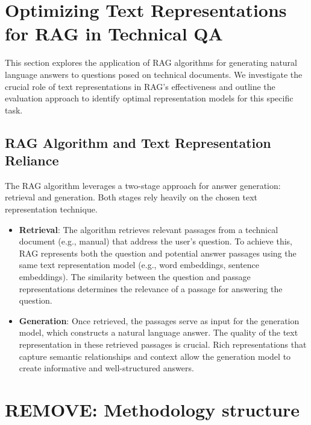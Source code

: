 %

\section{Optimizing Text Representations for \ac{RAG} in Technical \ac{QA}}
This section explores the application of \ac{RAG} algorithms for generating natural language answers to questions posed on technical documents.
We investigate the crucial role of text representations in \ac{RAG}'s effectiveness and outline the evaluation approach to identify optimal representation models for this specific task.

\subsection{\ac{RAG} Algorithm and Text Representation Reliance}
The RAG algorithm leverages a two-stage approach for answer generation: retrieval and generation.
Both stages rely heavily on the chosen text representation technique.

\begin{itemize}
  \item \textbf{Retrieval}: The algorithm retrieves relevant passages from a technical document (e.g., manual) that address the user's question. To achieve this, RAG represents both the question and potential answer passages using the same text representation model (e.g., word embeddings, sentence embeddings). The similarity between the question and passage representations determines the relevance of a passage for answering the question.  
  \item \textbf{Generation}: Once retrieved, the passages serve as input for the generation model, which constructs a natural language answer. The quality of the text representation in these retrieved passages is crucial. Rich representations that capture semantic relationships and context allow the generation model to create informative and well-structured answers.  
\end{itemize}

\section{REMOVE: Methodology structure}

